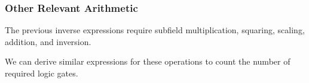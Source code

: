 \documentclass[10pt]{beamer}
\begin{document}
\begin{frame}
	\frametitle{Other Relevant Arithmetic}
	The previous inverse expressions require subfield multiplication, squaring, scaling, addition, and inversion.

	\pause
	\medskip

	We can derive similar expressions for these operations to count the number of required logic gates.

\end{frame}






\end{document}
